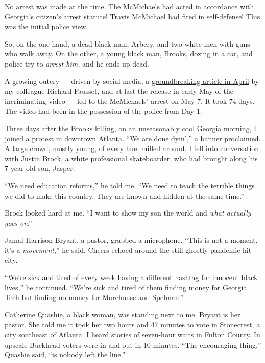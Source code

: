 No arrest was made at the time. The McMichaels had acted in accordance
with
\href{https://www.nytimes3xbfgragh.onion/article/ahmaud-arbery-citizen-arrest-law-georgia.html}{Georgia's
citizen's arrest statute}! Travis McMichael had fired in self-defense!
This was the initial police view.

So, on the one hand, a dead black man, Arbery, and two white men with
guns who walk away. On the other, a young black man, Brooks, dozing in a
car, and police try to \emph{arrest him,} and he ends up dead.

A growing outcry --- driven by social media, a
\href{https://www.nytimes3xbfgragh.onion/2020/04/26/us/ahmed-arbery-shooting-georgia.html}{groundbreaking
article in April} by my colleague Richard Fausset, and at last the
release in early May of the incriminating video --- led to the
McMichaels' arrest on May 7. It took 74 days. The video had been in the
possession of the police from Day 1.

Three days after the Brooks killing, on an unseasonably cool Georgia
morning, I joined a protest in downtown Atlanta. ``We are done dyin',''
a banner proclaimed. A large crowd, mostly young, of every hue, milled
around. I fell into conversation with Justin Brock, a white professional
skateboarder, who had brought along his 7-year-old son, Jasper.

``We need education reforms,'' he told me. ``We need to teach the
terrible things we did to make this country. They are known and hidden
at the same time.''

Brock looked hard at me. ``I want to show my son the world and
\emph{what actually goes on}.''

Jamal Harrison Bryant, a pastor, grabbed a microphone. ``This is not a
moment, it's a \emph{movement},'' he said. Cheers echoed around the
still-ghostly pandemic-hit city.

``We're sick and tired of every week having a different hashtag for
innocent black lives,''
\href{https://www.facebookcorewwwi.onion/jamalbryant/videos/2020-naacp-georgia-march-to-state-capital/2797160607062525/}{he
continued}. ``We're sick and tired of them finding money for Georgia
Tech but finding no money for Morehouse and Spelman.''

Catherine Quashie, a black woman, was standing next to me. Bryant is her
pastor. She told me it took her two hours and 47 minutes to vote in
Stonecrest, a city southeast of Atlanta. I heard stories of seven-hour
waits in Fulton County. In upscale Buckhead voters were in and out in 10
minutes. ``The encouraging thing,'' Quashie said, ``is nobody left the
line.''

